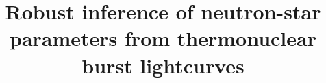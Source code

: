 \documentclass{aastex61}
\begin{document}
\title{Robust inference of neutron-star parameters from thermonuclear burst lightcurves}


\end{document}
